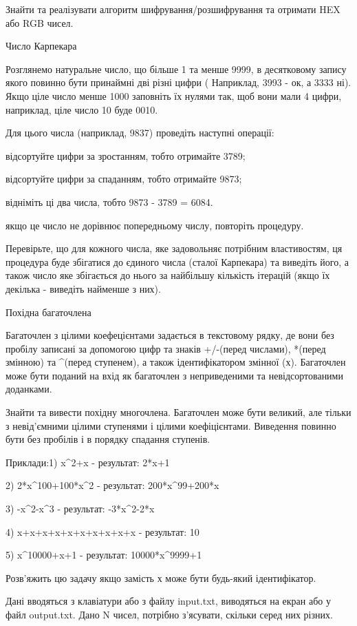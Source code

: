 \documentclass[]{article}
\begin{document}
Знайти та реалізувати алгоритм шифрування/розшифрування та отримати HEX
або RGB чисел.

Число Карпекара

Розглянемо натуральне число, що більше 1 та менше 9999, в десятковому
запису якого повинно бути принаймні дві різні цифри ( Наприклад, 3993 -
ок, а 3333 ні). Якщо ціле число менше 1000 заповніть їх нулями так, щоб
вони мали 4 цифри, наприклад, ціле число 10 буде 0010.

Для цього числа (наприклад, 9837) проведіть наступні операції:

відсортуйте цифри за зростанням, тобто отримайте 3789;

відсортуйте цифри за спаданням, тобто отримайте 9873;

відніміть ці два числа, тобто 9873 - 3789 = 6084.

якщо це число не дорівнює попередньому числу, повторіть процедуру.

Перевірьте, що для кожного числа, яке задовольняє потрібним
властивостям, ця процедура буде збігатися до єдиного числа (сталої
Карпекара) та виведіть його, а також число яке збігається до нього за
найбільшу кількість ітерацій (якщо їх декілька - виведіть найменше з
них).

Похідна багаточлена

Багаточлен з цілими коефецієнтами задається в текстовому рядку, де вони
без пробілу записані за допомогою цифр та знаків +/-(перед числами),
*(перед змінною) та \^{}(перед ступенем), а також ідентифікатором
змінної (х). Багаточлен може бути поданий на вхід як багаточлен з
неприведеними та невідсортованими доданками.

Знайти та вивести похідну многочлена. Багаточлен може бути великий, але
тільки з невід'ємними цілими ступенями і цілими коефіцієнтами. Виведення
повинно бути без пробілів і в порядку спадання ступенів.

Приклади:1) x\^{}2+x - результат: 2*x+1

2) 2*x\^{}100+100*x\^{}2 - результат: 200*x\^{}99+200*x

3) -x\^{}2-x\^{}3 - результат: -3*x\^{}2-2*x

4) x+x+x+x+x+x+x+x+x+x - результат: 10

5) x\^{}10000+x+1 - результат: 10000*x\^{}9999+1

Розв'яжить цю задачу якщо замість х може бути будь-який ідентифікатор.



Дані вводяться з клавіатури або з файлу input.txt, виводяться на екран або у файл output.txt.
 Дано N чисел, потрібно з'ясувати, скільки серед них різних.
\end{document}
